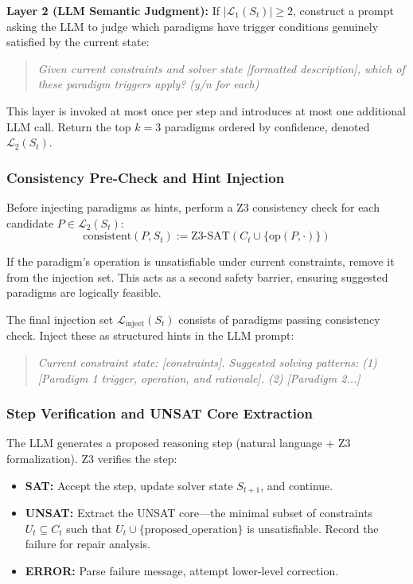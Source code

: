 \textbf{Layer 2 (LLM Semantic Judgment):} If $|\mathcal{L}_1(S_t)| \geq 2$, construct a prompt asking the LLM to judge which paradigms have trigger conditions genuinely satisfied by the current state:

\begin{quote}
\textit{Given current constraints and solver state [formatted description], which of these paradigm triggers apply? (y/n for each)}
\end{quote}

This layer is invoked at most once per step and introduces at most one additional LLM call. Return the top $k = 3$ paradigms ordered by confidence, denoted $\mathcal{L}_2(S_t)$.

\subsubsection{Consistency Pre-Check and Hint Injection}

Before injecting paradigms as hints, perform a Z3 consistency check for each candidate $P \in \mathcal{L}_2(S_t)$:
\[
\text{consistent}(P, S_t) := \text{Z3-SAT}(C_t \cup \{\text{op}(P, \cdot)\})
\]

If the paradigm's operation is unsatisfiable under current constraints, remove it from the injection set. This acts as a second safety barrier, ensuring suggested paradigms are logically feasible.

The final injection set $\mathcal{L}_{\text{inject}}(S_t)$ consists of paradigms passing consistency check. Inject these as structured hints in the LLM prompt:

\begin{quote}
\textit{Current constraint state: [constraints]. Suggested solving patterns: (1) [Paradigm 1 trigger, operation, and rationale]. (2) [Paradigm 2...]}
\end{quote}

\subsubsection{Step Verification and UNSAT Core Extraction}

The LLM generates a proposed reasoning step (natural language + Z3 formalization). Z3 verifies the step:
\begin{itemize}
    \item \textbf{SAT:} Accept the step, update solver state $S_{t+1}$, and continue.
    \item \textbf{UNSAT:} Extract the UNSAT core—the minimal subset of constraints $U_t \subseteq C_t$ such that $U_t \cup \{\text{proposed\_operation}\}$ is unsatisfiable. Record the failure for repair analysis.
    \item \textbf{ERROR:} Parse failure message, attempt lower-level correction.
\end{itemize}

